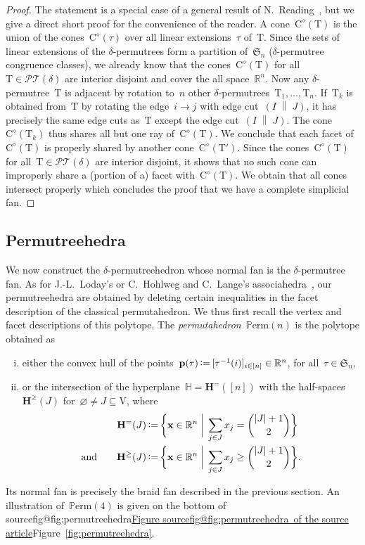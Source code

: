 \documentclass[10pt]{amsart}
\makeatletter
\theoremstyle{definition}\newtheorem{definition}[theorem]{Definition}\newtheorem{remark}[theorem]{Remark}\newtheorem{example}[theorem]{Example}
\newcommand{\R}{\mathbb{R}} %
\newcommand{\HH}{\mathbb{H}} %
\newcommand{\fS}{\mathfrak{S}} %
\renewcommand{\b}[1]{\mathbf{#1}} %
\newcommand{\biggset}[2]{\bigg\{ #1 \;\bigg|\; #2 \bigg\}} %
\newcommand{\eqdef}{\mbox{\,\raisebox{0.2ex}{\scriptsize\ensuremath{\mathrm:}}\ensuremath{=}\,}} %
\newcommand{\polar}{^\diamond} %
\newcommand{\tree}[1][T]{\mathrm{#1}} %
\newcommand{\ground}{\mathrm{V}} %
\newcommand{\decoration}{\delta} %
\newcommand{\edgecut}[2]{\left( #1 \;\middle\|\; #2 \right)} %
\newcommand{\Permutrees}{\mathcal{PT}} %
\newcommand{\Perm}[1][n]{\mathds{P}\mathrm{erm}(#1)} %
\newcommand{\Cone}{\mathrm{C}} %
\newcommand{\Hyp}{\b{H}^=} %
\newcommand{\HS}{\b{H}^\ge} %
\newcommand{\fref}[1]{Figure~\ref{#1}} %
\newcommand{\darkblue}{\color{darkblue}} %
\newcommand{\defn}[1]{\emph{\darkblue #1}} %
\renewcommand{\fref}[1]{\ifcsname sourcefig@#1\endcsname\href{https://doi.org/10.5802/alco.1}{Figure \csname sourcefig@#1\endcsname\ of the source article}\else Figure~\ref{#1}\fi}
\makeatother
\begin{document}
\begin{proof}
The statement is a special case of a general result of N.~Reading~\cite[Theorem~1.1]{Reading-HopfAlgebras}, but we give a direct short proof for the convenience of the reader. A cone~$\Cone\polar(\tree)$ is the union of the cones~$\Cone\polar(\tau)$ over all linear extensions~$\tau$ of~$\tree$. Since the sets of linear extensions of the $\decoration$-permutrees form a partition of~$\fS_n$ ($\decoration$-permutree congruence classes), we already know that the cones~$\Cone\polar(\tree)$ for all~$\tree \in \Permutrees(\decoration)$ are interior disjoint and cover the all space~$\R^n$. Now any $\decoration$-permutree~$\tree$ is adjacent by rotation to~$n$ other $\decoration$-permutrees~$\tree_1, \dots, \tree_n$. If~$\tree_k$ is obtained from~$\tree$ by rotating the edge~$i \to j$ with edge cut~$\edgecut{I}{J}$, it has precisely the same edge cuts as~$\tree$ except the edge cut~$\edgecut{I}{J}$. The cone~$\Cone\polar(\tree_k)$ thus shares all but one ray of~$\Cone\polar(\tree)$. We conclude that each facet of~$\Cone\polar(\tree)$ is properly shared by another cone~$\Cone\polar(\tree')$. Since the cones~$\Cone\polar(\tree)$ for all~$\tree \in \Permutrees(\decoration)$ are interior disjoint, it shows that no such cone can improperly share a (portion of a) facet with~$\Cone\polar(\tree)$. We obtain that all cones intersect properly which concludes the proof that we have a complete simplicial fan.
\end{proof}
\subsection{Permutreehedra}
\label{subsec:permutreehedra}

We now construct the $\decoration$-permutreehedron whose normal fan is the $\decoration$-permutree fan. As for J.-L.~Loday's or C.~Hohlweg and C.~Lange's associahedra~\cite{Loday, HohlwegLange}, our permutreehedra are obtained by deleting certain inequalities in the facet description of the classical permutahedron. We thus first recall the vertex and facet descriptions of this polytope. The \defn{permutahedron}~$\Perm$ is the polytope obtained as
\begin{enumerate}[(i)]
\item either the convex hull of the points~$\b{p}(\tau) \eqdef [\tau^{-1}(i)]_{i \in [n]} \in \R^n$, for all~$\tau \in \fS_n$,
\item or the intersection of the hyperplane~$\HH = \Hyp([n])$ with the half-spaces~$\HS(J)$ for~$\varnothing \ne J \subseteq \ground$, where
\begin{align*}
\Hyp(J) & \eqdef \biggset{\b{x} \in \R^n}{\sum_{j \in J} x_j = \binom{|J|+1}{2}} \\\text{and} \qquad \HS(J) & \eqdef \biggset{\b{x} \in \R^n}{\sum_{j \in J} x_j \ge \binom{|J|+1}{2}}.
\end{align*}
\end{enumerate}
Its normal fan is precisely the braid fan described in the previous section. An illustration of~$\Perm[4]$ is given on the bottom of \fref{fig:permutreehedra}.
\end{document}
